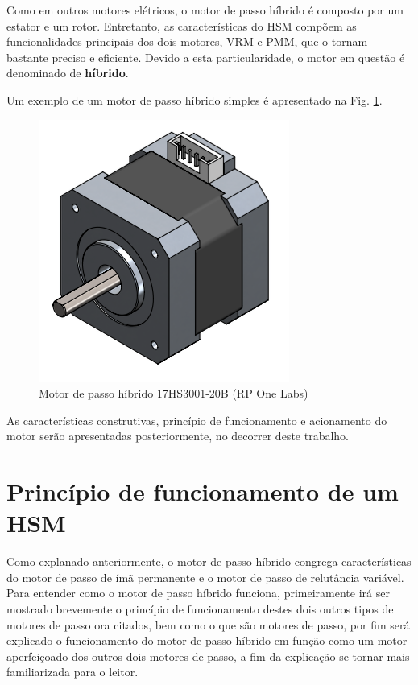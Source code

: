 \documentclass[portugues]{sobraep}
\begin{document}
	Como em outros motores elétricos, o motor de passo híbrido é composto por um estator e um rotor. Entretanto, as características do HSM compõem as funcionalidades principais dos dois motores, VRM e PMM, que o tornam bastante preciso e eficiente. Devido a esta particularidade, o motor em questão é denominado de \textbf{híbrido}.
	
	Um exemplo de um motor de passo híbrido simples é apresentado na Fig. \ref{HSMgrafico}.
	
	\begin{figure}
		\centering
		\includegraphics[width=\columnwidth]{Images/HSMmodel.png}
		\caption{Motor de passo híbrido 17HS3001-20B (RP One Labs)}
		\label{HSMgrafico}
	\end{figure} 
	
	As características construtivas, princípio de funcionamento e acionamento do motor serão apresentadas posteriormente, no decorrer deste trabalho. 

\section{Princípio de funcionamento de um HSM}
Como explanado anteriormente, o motor de passo híbrido congrega características do motor de passo de ímã permanente e o motor de passo de relutância variável. Para entender como o motor de passo híbrido funciona, primeiramente irá ser mostrado brevemente o princípio de funcionamento destes dois outros tipos de motores de passo ora citados, bem como o que são motores de passo, por fim será explicado o funcionamento do motor de passo híbrido em função como um motor aperfeiçoado dos outros dois motores de passo, a fim da explicação se tornar mais familiarizada para o leitor.  
\end{document}
